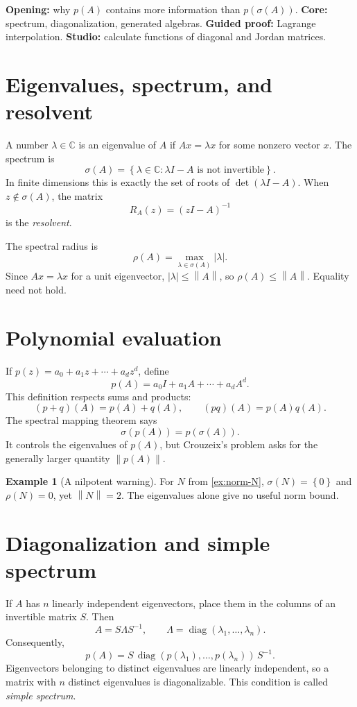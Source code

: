 \documentclass[11pt,oneside,openany]{book}
\theoremstyle{definition}
\newtheorem{example}[theorem]{Example}
\theoremstyle{remark}
\newcommand{\C}{\mathbb C}
\newcommand{\diag}{\operatorname{diag}}
\newcommand{\spec}{\sigma}
\newcommand{\norm}[1]{\left\lVert #1\right\rVert}
\newcommand{\abs}[1]{\left\lvert #1\right\rvert}
\newcommand{\set}[1]{\left\{#1\right\}}
\begin{document}
\begin{workshopplan}
\textbf{Opening:} why \(p(A)\) contains more information than
\(p(\spec(A))\). \textbf{Core:} spectrum, diagonalization, generated
algebras. \textbf{Guided proof:} Lagrange interpolation.
\textbf{Studio:} calculate functions of diagonal and Jordan matrices.
\end{workshopplan}

\section{Eigenvalues, spectrum, and resolvent}

A number \(\lambda\in\C\) is an eigenvalue of \(A\) if
\(Ax=\lambda x\) for some nonzero vector \(x\).  The spectrum is
\[
  \spec(A)=\set{\lambda\in\C:\lambda I-A\text{ is not invertible}}.
\]
In finite dimensions this is exactly the set of roots of
\(\det(\lambda I-A)\).  When \(z\notin\spec(A)\), the matrix
\[
  R_A(z)=(zI-A)^{-1}
\]
is the \emph{resolvent}.

The spectral radius is
\[
  \rho(A)=\max_{\lambda\in\spec(A)}|\lambda|.
\]
Since \(Ax=\lambda x\) for a unit eigenvector,
\(\abs{\lambda}\leq\norm{A}\), so \(\rho(A)\leq\norm{A}\).
Equality need not hold.

\section{Polynomial evaluation}

If \(p(z)=a_0+a_1z+\cdots+a_dz^d\), define
\[
  p(A)=a_0I+a_1A+\cdots+a_dA^d.
\]
This definition respects sums and products:
\[
  (p+q)(A)=p(A)+q(A),\qquad (pq)(A)=p(A)q(A).
\]
The spectral mapping theorem says
\[
  \spec(p(A))=p(\spec(A)).
\]
It controls the eigenvalues of \(p(A)\), but Crouzeix's problem asks
for the generally larger quantity \(\norm{p(A)}\).

\begin{example}[A nilpotent warning]
For \(N\) from \cref{ex:norm-N}, \(\spec(N)=\set{0}\) and
\(\rho(N)=0\), yet \(\norm{N}=2\).  The eigenvalues alone give no
useful norm bound.
\end{example}

\section{Diagonalization and simple spectrum}

If \(A\) has \(n\) linearly independent eigenvectors, place them in the
columns of an invertible matrix \(S\).  Then
\[
  A=S\Lambda S^{-1},
  \qquad
  \Lambda=\diag(\lambda_1,\ldots,\lambda_n).
\]
Consequently,
\[
  p(A)=S\,\diag(p(\lambda_1),\ldots,p(\lambda_n))\,S^{-1}.
\]
Eigenvectors belonging to distinct eigenvalues are linearly
independent, so a matrix with \(n\) distinct eigenvalues is
diagonalizable.  This condition is called \emph{simple spectrum}.
\end{document}
